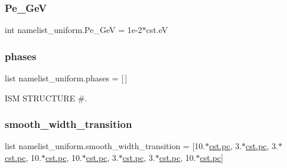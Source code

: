 \mbox{\label{namespacenamelist__uniform_a7bbc46f7d53cc0d4c7aab507cd755aef}} 
\subsubsection{\texorpdfstring{Pe\+\_\+GeV}{Pe\_1GeV}}
{\footnotesize\ttfamily int namelist\+\_\+uniform.\+Pe\+\_\+GeV = 1e-\/2$\ast$cst.\+eV}

\mbox{\label{namespacenamelist__uniform_af1285b6f4d49dc05ff5114a84c87ea03}} 
\subsubsection{\texorpdfstring{phases}{phases}}
{\footnotesize\ttfamily list namelist\+\_\+uniform.\+phases = \mbox{[}$\,$\mbox{]}}



I\+SM S\+T\+R\+U\+C\+T\+U\+RE \#. 

\mbox{\label{namespacenamelist__uniform_a04941e0b287d9299562191015a5d566c}} 
\subsubsection{\texorpdfstring{smooth\+\_\+width\+\_\+transition}{smooth\_width\_transition}}
{\footnotesize\ttfamily list namelist\+\_\+uniform.\+smooth\+\_\+width\+\_\+transition = \mbox{[}10.$\ast$\hyperlink{constants_8h_a2884cd030c4c825754349a525a1d06ce}{cst.\+pc}, 3.$\ast$\hyperlink{constants_8h_a2884cd030c4c825754349a525a1d06ce}{cst.\+pc}, 3.$\ast$\hyperlink{constants_8h_a2884cd030c4c825754349a525a1d06ce}{cst.\+pc}, 10.$\ast$\hyperlink{constants_8h_a2884cd030c4c825754349a525a1d06ce}{cst.\+pc}, 10.$\ast$\hyperlink{constants_8h_a2884cd030c4c825754349a525a1d06ce}{cst.\+pc}, 3.$\ast$\hyperlink{constants_8h_a2884cd030c4c825754349a525a1d06ce}{cst.\+pc}, 3.$\ast$\hyperlink{constants_8h_a2884cd030c4c825754349a525a1d06ce}{cst.\+pc}, 10.$\ast$\hyperlink{constants_8h_a2884cd030c4c825754349a525a1d06ce}{cst.\+pc}\mbox{]}}

